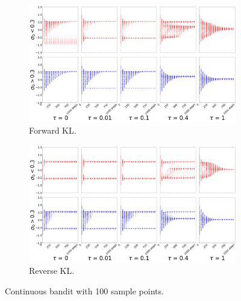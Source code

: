 \documentclass{article}
\begin{document}
\begin{figure}[!htb]
  \centering
  \begin{subfigure}[b]{0.5\linewidth}
    \centering
    \includegraphics[width=0.8\columnwidth]{figs/bandit/monte-carlo/100/mean_forward_optim=adam_modes=1_lr=0.005.png}
    \caption{Forward KL.}
    \label{fig:100-sample-cont-bandit-forward}
  \end{subfigure}%
  \begin{subfigure}[b]{0.5\linewidth}
        \centering
        \includegraphics[width=0.8\columnwidth]{figs/bandit/monte-carlo/100/mean_reverse_optim=adam_modes=1_lr=0.005.png}
        \caption{Reverse KL.}
        \label{fig:100-sample-cont-bandit-reverse}
  \end{subfigure}
  \caption{Continuous bandit with 100 sample points.}
\end{figure}
\end{document}
